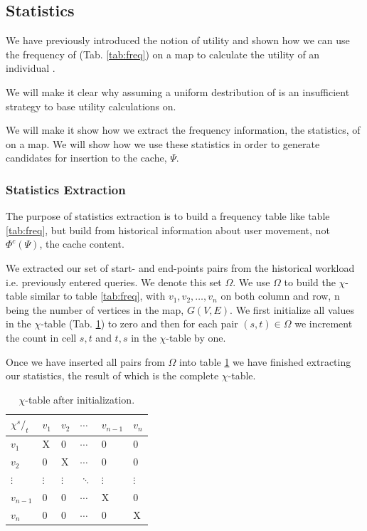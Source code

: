 



\subsection{Statistics}

We have previously introduced the notion of utility and shown how we can use the frequency of \spaths (Tab. \ref{tab:freq}) on a map to calculate the utility of an individual \spathns. 

We will make it clear why assuming a uniform destribution of \spaths is an insufficient strategy to base utility calculations on.

We will make it show how we extract the frequency information, the statistics, of \spaths on a map. We will show how we use these statistics in order to generate \spath candidates for insertion to the cache, $\Psi$.

\subsubsection{Statistics Extraction}\label{sec:statextract}


The purpose of statistics extraction is to build a frequency table like table \ref{tab:freq}, but build from historical information about user movement, not $\Phi^c(\Psi)$, the cache content.

We extracted our set of start- and end-points pairs from the historical workload i.e. previously entered \spath queries. We denote this set $\Omega$. We use $\Omega$ to build the $\chi$-table similar to table \ref{tab:freq}, with $v_1,v_2,\ldots,v_n$ on both column and row, n being the number of vertices in the map, $G(V,E)$. We first initialize all values in the $\chi$-table (Tab. \ref{tab:chitable}) to zero and then for each pair $(s,t) \in \Omega$ we increment the count in cell $s,t$ and $t,s$ in the $\chi$-table by one.

Once we have inserted all pairs from $\Omega$ into table \ref{tab:chitable} we have finished extracting our statistics, the result of which is the complete $\chi$-table.

\begin{table}
\center
\begin{tabular}{|l||l|l|l|l|l|}
\textbf{$\chi {^s/_t}$}	& $v_1$		& $v_2$		& $\cdots$	& $v_{n-1}$	& $v_n$	\\\hline
$v_1$			& X		& 0		& $\cdots$	& 0		& 0	 \\
$v_2$			& 0		& X		& $\cdots$	& 0		& 0	 \\
$\vdots$		& $\vdots$	& $\vdots$	& $\ddots$	& $\vdots$	& $\vdots$ \\
$v_{n-1}$		& 0		& 0		& $\cdots$	& X		& 0	 \\
$v_n$			& 0		& 0		& $\cdots$	& 0		& X	 \\
\end{tabular}
\caption{$\chi$-table after initialization.}
\label{tab:chitable}
\end{table}

